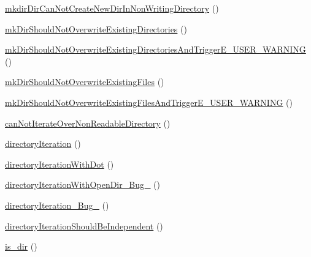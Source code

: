 \begin{DoxyCompactItemize}
\item 
\mbox{\hyperlink{classorg_1_1bovigo_1_1vfs_1_1vfs_stream_wrapper_mk_dir_test_case_a12778ab69f9a85a46e853775e4281342}{mkdir\+Dir\+Can\+Not\+Create\+New\+Dir\+In\+Non\+Writing\+Directory}} ()
\item 
\mbox{\hyperlink{classorg_1_1bovigo_1_1vfs_1_1vfs_stream_wrapper_mk_dir_test_case_a4c7781857de68e8ed8a35669159656ac}{mk\+Dir\+Should\+Not\+Overwrite\+Existing\+Directories}} ()
\item 
\mbox{\hyperlink{classorg_1_1bovigo_1_1vfs_1_1vfs_stream_wrapper_mk_dir_test_case_a72e64203a108af87fb2928e6d7676166}{mk\+Dir\+Should\+Not\+Overwrite\+Existing\+Directories\+And\+Trigger\+E\+\_\+\+U\+S\+E\+R\+\_\+\+W\+A\+R\+N\+I\+NG}} ()
\item 
\mbox{\hyperlink{classorg_1_1bovigo_1_1vfs_1_1vfs_stream_wrapper_mk_dir_test_case_a2af02d877af008a9ce11a97016fc7759}{mk\+Dir\+Should\+Not\+Overwrite\+Existing\+Files}} ()
\item 
\mbox{\hyperlink{classorg_1_1bovigo_1_1vfs_1_1vfs_stream_wrapper_mk_dir_test_case_a11fe3c20b337fedbb7c7b4c109ca0e93}{mk\+Dir\+Should\+Not\+Overwrite\+Existing\+Files\+And\+Trigger\+E\+\_\+\+U\+S\+E\+R\+\_\+\+W\+A\+R\+N\+I\+NG}} ()
\item 
\mbox{\hyperlink{classorg_1_1bovigo_1_1vfs_1_1vfs_stream_wrapper_mk_dir_test_case_a30804959deeb5e1297a8045a15673ed0}{can\+Not\+Iterate\+Over\+Non\+Readable\+Directory}} ()
\item 
\mbox{\hyperlink{classorg_1_1bovigo_1_1vfs_1_1vfs_stream_wrapper_mk_dir_test_case_abdc3628fed5eab1e63627e8a6db704f4}{directory\+Iteration}} ()
\item 
\mbox{\hyperlink{classorg_1_1bovigo_1_1vfs_1_1vfs_stream_wrapper_mk_dir_test_case_a604f75224353546f472cf58a53ee906f}{directory\+Iteration\+With\+Dot}} ()
\item 
\mbox{\hyperlink{classorg_1_1bovigo_1_1vfs_1_1vfs_stream_wrapper_mk_dir_test_case_ab8f5226e54c28d2ab9937486973a2a6a}{directory\+Iteration\+With\+Open\+Dir\+\_\+\+Bug\+\_}} ()
\item 
\mbox{\hyperlink{classorg_1_1bovigo_1_1vfs_1_1vfs_stream_wrapper_mk_dir_test_case_a7ef9f330a131b84763c875303ebe202e}{directory\+Iteration\+\_\+\+Bug\+\_}} ()
\item 
\mbox{\hyperlink{classorg_1_1bovigo_1_1vfs_1_1vfs_stream_wrapper_mk_dir_test_case_a3e31e614bbaa796f91aff970454ed210}{directory\+Iteration\+Should\+Be\+Independent}} ()
\item 
\mbox{\hyperlink{classorg_1_1bovigo_1_1vfs_1_1vfs_stream_wrapper_mk_dir_test_case_ae4610fb47291ed2c6f880c671de0e8dd}{is\+\_\+dir}} ()

\end{DoxyCompactItemize}
